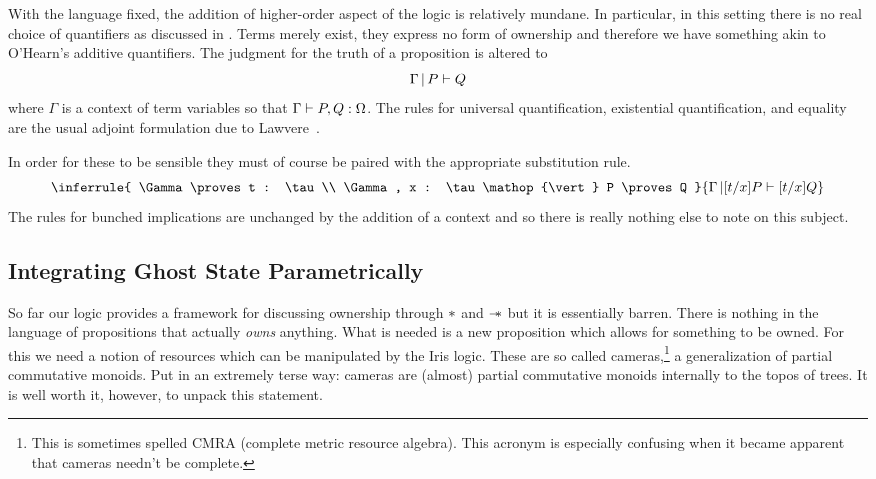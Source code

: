 \documentclass{amsart}
\newcommand{\provesJ}[3]{#1 \mathop{\vert} #2 \proves #3}
\begin{document}
With the language fixed, the addition of higher-order aspect of the
logic is relatively mundane. In particular, in this setting there is
no real choice of quantifiers as discussed in \citet{OHearn:99}. Terms
merely exist, they express no form of ownership and therefore we have
something akin to O'Hearn's additive quantifiers. The judgment for the
truth of a proposition is altered to
\[
  \provesJ{\Gamma}{P}{Q}
\]
where $\Gamma$ is a context of term variables so that
$\Gamma \vdash P, Q : \Omega$. The rules for universal
quantification, existential quantification, and equality are the usual
adjoint formulation due to Lawvere~\citep{Lawvere:70}.
In order for these to be sensible they must of course be paired with
the appropriate substitution rule.
\[
  \inferrule{
    \Gamma \proves t : \tau\\
    \provesJ{\Gamma, x : \tau}{P}{Q}
  }{\provesJ{\Gamma}{[t/x]P}{[t/x]Q}}
\]
The rules for bunched implications are unchanged by the addition of a
context and so there is really nothing else to note on this subject.

\subsection{Integrating Ghost State Parametrically}\label{subsec:ghost}

So far our logic provides a framework for discussing ownership through
$\ast$ and $\mathrel{-\!\!*}$ but it is essentially barren. There is nothing in
the language of propositions that actually \emph{owns} anything. What
is needed is a new proposition which allows for something to be
owned. For this we need a notion of resources which can be manipulated
by the Iris logic. These are so called cameras,\footnote{This is
  sometimes spelled CMRA (complete metric resource algebra). This
  acronym is especially confusing when it became apparent that cameras
  needn't be complete.} a
generalization of partial commutative monoids. Put in an extremely
terse way: cameras are (almost) partial commutative monoids internally
to the topos of trees. It is well worth it, however, to unpack this
statement.
\end{document}
